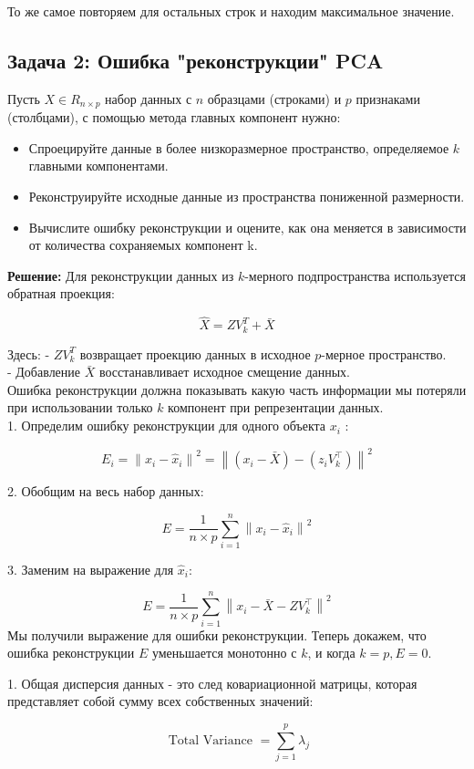 То же самое повторяем для остальных строк и находим максимальное значение.
\subsection{Задача 2: Ошибка "реконструкции" PCA}
Пусть $X \in R_{n\times p}$ набор данных с $n$ образцами (строками) и $p$ признаками (столбцами), с помощью метода главных компонент нужно:
\begin{itemize}
\item{Спроецируйте данные в более низкоразмерное пространство, определяемое $k$ главными компонентами.}
\item {Реконструируйте исходные данные из пространства пониженной размерности.}
\item {Вычислите ошибку реконструкции и оцените, как она меняется в зависимости от количества сохраняемых компонент k.}
\end{itemize}
\textbf{Решение:}
Для реконструкции данных из $k$-мерного подпространства используется обратная проекция:

$$
\hat{X}=Z V_k^T+\bar{X}
$$


Здесь:
- $Z V_k^T$ возвращает проекцию данных в исходное $p$-мерное пространство.\\
- Добавление $\bar{X}$ восстанавливает исходное смещение данных. \\
Ошибка реконструкции должна показывать какую часть информации мы потеряли при использовании только $k$ компонент при репрезентации данных.\\
1. Определим ошибку реконструкции для одного объекта $x_i$ :

$$
E_i=\left\|x_i-\hat{x}_i\right\|^2=\left\|\left(x_i-\bar{X}\right)-\left(z_i V_k^{\top}\right)\right\|^2
$$

2. Обобщим на весь набор данных:

$$
E=\frac{1}{n \times p} \sum_{i=1}^n\left\|x_i-\hat{x}_i\right\|^2
$$

3. Заменим на выражение для $\hat{x}_i$:

$$
E=\frac{1}{n \times p} \sum_{i=1}^n\left\|x_i-\bar{X}-Z V_k^{\top}\right\|^2
$$
Мы получили выражение для ошибки реконструкции. Теперь докажем, что 
ошибка реконструкции $E$ уменьшается монотонно с $k$, и когда $k=p, E=0$.

1. Общая дисперсия данных - это след ковариационной матрицы, которая представляет собой сумму всех собственных значений:

$$
\text { Total Variance }=\sum_{j=1}^p \lambda_j
$$

